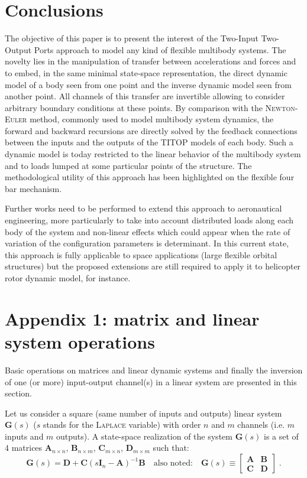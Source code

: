 \documentclass[smallcondensed]{svjour3}     %
\begin{document}
\section{Conclusions}
The objective of this paper is to present the interest of the Two-Input Two-Output Ports approach to model any kind of flexible multibody systems. The novelty lies in the manipulation of transfer between accelerations and forces and to embed, in the same minimal state-space representation, the direct dynamic model of a body seen from one point and the inverse dynamic model seen from another point. All channels of this transfer are invertible allowing to consider arbitrary boundary conditions at these points. By comparison with the \textsc{Newton}-\textsc{Euler} method, commonly used to model multibody system dynamics, the forward and backward recursions are directly solved by the feedback connections between the inputs and the outputs of the TITOP models of each body. Such a dynamic model is today restricted to the linear behavior of the multibody system and to loads lumped at some particular points of the structure. The methodological utility of this approach has been highlighted on the flexible four bar mechanism. 

Further works need to be performed to extend this approach to aeronautical engineering, more particularly to take into account distributed loads along each body of the system and non-linear effects which could appear when the rate of variation of the configuration parameters is determinant. In this current state, this approach is fully applicable to space applications (large flexible orbital structures) but the proposed extensions are still required to apply it to helicopter rotor dynamic model, for instance.

\section*{Appendix 1: matrix and linear system operations}\label{sect:annexe}
Basic operations on matrices and linear dynamic systems and finally the inversion of one (or more) input-output channel(s) in a linear system are presented in this section.

Let us consider a square (same number of inputs and outputs) linear system $\mathbf{G}(s)$ ($s$ stands for the \textsc{Laplace} variable) with order $n$ and $m$ channels (i.e. $m$ inputs and $m$ outputs). A state-space realization of the system $\mathbf{G}(s)$ is a set of 4 matrices $\mathbf{A}_{n \times n}$, $\mathbf{B}_{n \times m}$, $\mathbf{C}_{m \times n}$, $\mathbf{D}_{m \times m}$ such that:
\begin{equation}
\mathbf{G}(s)=\mathbf{D}+\mathbf{C}\left( s\mathbf{I}_n-\mathbf{A}\right)^{-1}\mathbf{B}\quad \mbox{also noted:}\quad \mathbf{G}(s)\equiv \left[\begin{array}{c|c}\mathbf{A} & \mathbf{B} \\ \hline \mathbf{C} & \mathbf{D} \end{array}\right]\;.
\end{equation}
\end{document}
